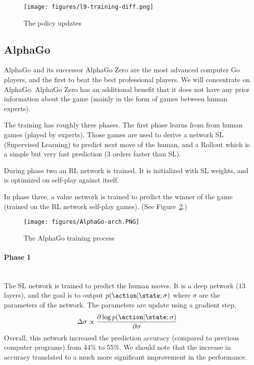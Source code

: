 \begin{figure}
  \begin{centering}
 \texttt{[image: figures/l9-training-diff.png]}\\
  \caption{The policy updates}\label{fig:training-diff}
  \end{centering}
\end{figure}




\subsection{AlphaGo}

AlphaGo and its successor AlphaGo Zero are the most advanced
computer Go players, and the first to beat the best professional
players. We will concentrate on AlphaGo. AlphaGo Zero has an
additional benefit that it does not have any prior information about
the game (mainly in the form of games between human experts).

The training has roughly three phases. The first phase learns from
from human games (played by experts). Those games are used to derive
a network SL (Supervised Learning) to predict next move of the
human, and a Rollout which is a simple but very fast prediction (3
orders faster than SL).

During phase two an RL network is trained. It is initialized with SL
weights, and is optimized on self-play against itself.

In phase three, a value network is trained to predict the winner of
the game (trained on the RL network self-play games). (See
Figure~\ref{fig:AlphaGo-arch}.)


\begin{figure}
  \begin{centering}
  \texttt{[image: figures/AlphaGo-arch.PNG]}\\
  \caption{The AlphaGo training process}\label{fig:AlphaGo-arch}
  \end{centering}
\end{figure}

\paragraph{Phase 1}\ \\
The SL network is trained to predict the human moves. It is a deep
network (13 layers), and the goal is to output
$p(\action|\state;\sigma)$ where $\sigma$ are the parameters of the
network. The parameters are update using a gradient step,
\[
\Delta \sigma \propto \frac{\partial \log
p(\action|\state;\sigma)}{\partial \sigma}
\]
Overall, this network increased the prediction accuracy (compared to
previous computer programs) from 44\% to 55\%. We should note that
the increase in accuracy translated to a much more significant
improvement in the performance.


